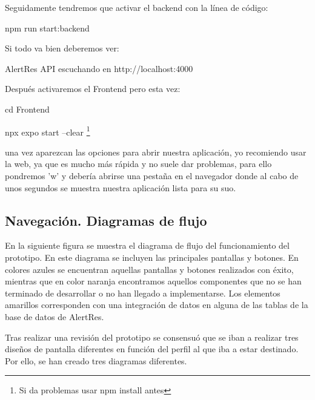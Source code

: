Seguidamente tendremos que activar el backend con la línea de código:

npm run start:backend

Si todo va bien deberemos ver:

AlertRes API escuchando en http://localhost:4000

Después activaremos el Frontend pero esta vez:

cd Frontend

npx expo start --clear \footnote{Si da problemas usar npm install antes}

una vez aparezcan las opciones para abrir nuestra aplicación, yo recomiendo usar la web, ya que es mucho más rápida y no suele dar problemas, para ello pondremos 'w' y debería abrirse una pestaña en el navegador donde al cabo de unos segundos se muestra nuestra aplicación lista para su suo.

\vspace{10cm}

    \subsection{Navegación. Diagramas de flujo}    
    En la siguiente figura se muestra el diagrama de flujo del funcionamiento del prototipo. En este diagrama se incluyen las principales pantallas y botones. En colores azules se encuentran aquellas pantallas y botones realizados con éxito, mientras que en color naranja encontramos aquellos componentes que no se han terminado de desarrollar o no han llegado a implementarse. Los elementos amarillos corresponden con una integración de datos en alguna de las tablas de la base de datos de AlertRes.
    

\vspace{1cm}

    Tras realizar una revisión del prototipo se consensuó que se iban a realizar tres diseños de pantalla diferentes en función del perfil al que iba a estar destinado. Por ello, se han creado tres diagramas diferentes.
    

